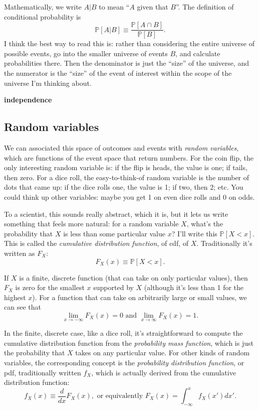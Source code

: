 Mathematically, we write \(A | B\) to mean ``\(A\) given that \(B\)''.
The definition of conditional probability is \[
\mathbb{P}[A | B] \equiv \frac{\mathbb{P}[A \cap B]}{\mathbb{P}[B]}.
\] I think the best way to read this is: rather than considering the
entire universe of possible events, go into the smaller universe of
events \(B\), and calculate probabilities there. Then the denominator is
just the ``size'' of the universe, and the numerator is the ``size'' of
the event of interest within the scope of the universe I'm thinking
about.

\textbf{independence}

\subsection{Random variables}\label{random-variables}

We can associated this space of outcomes and events with \emph{random
variables}, which are functions of the event space that return numbers.
For the coin flip, the only interesting random variable is: if the flip
is heads, the value is one; if tails, then zero. For a dice roll, the
easy-to-think-of random variable is the number of dots that came up: if
the dice rolls one, the value is 1; if two, then 2; etc. You could think
up other variables: maybe you get 1 on even dice rolls and 0 on odds.

To a scientist, this sounds really abstract, which it is, but it lets us
write something that feels more natural: for a random variable \(X\),
what's the probability that \(X\) is less than some particular value
\(x\)? I'll write this \(\mathbb{P}[X < x]\). This is called the
\emph{cumulative distribution function}, of cdf, of \(X\). Traditionally
it's written as \(F_X\): \[
F_X(x) \equiv \mathbb{P}[X < x].
\]

If \(X\) is a finite, discrete function (that can take on only
particular values), then \(F_X\) is zero for the smallest \(x\)
supported by \(X\) (although it's less than 1 for the highest \(x\)).
For a function that can take on arbitrarily large or small values, we
can see that \[
\lim_{x \to -\infty} F_X(x) = 0 \text{ and } \lim_{x \to \infty} F_X(x) = 1.
\]

In the finite, discrete case, like a dice roll, it's straightforward to
compute the cumulative distribution function from the \emph{probability
mass function}, which is just the probability that \(X\) takes on any
particular value. For other kinds of random variables, the corresponding
concept is the \emph{probability distribution function}, or pdf,
traditionally written \(f_X\), which is actually derived from the
cumulative distribution function: \[
f_X(x) \equiv \frac{d}{dx} F_X(x), \text{ or equivalently } F_X(x) = \int_{-\infty}^x f_X(x') dx'.
\]

